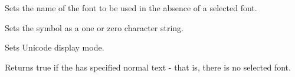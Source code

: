 \label{wxsymbolpickerdialogsetnormaltextfontname}


Sets the name of the font to be used in the absence of a selected font.

\label{wxsymbolpickerdialogsetsymbol}


Sets the symbol as a one or zero character string.

\label{wxsymbolpickerdialogsetunicodemode}


Sets Unicode display mode.

\label{wxsymbolpickerdialogusenormalfont}


Returns true if the has specified normal text - that is, there is no selected font.

